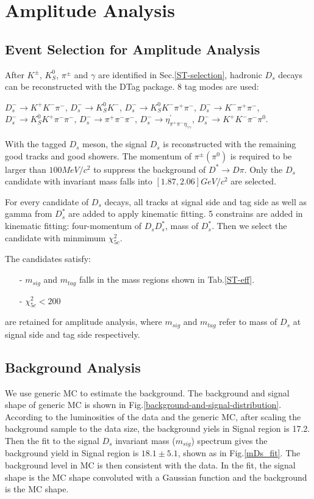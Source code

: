 \section{Amplitude Analysis}

\subsection{Event Selection for Amplitude Analysis}
\label{AASelection}
\par{
After $K^{\pm}$, $K_S^{0}$, $\pi^{\pm}$ and $\gamma$ are identified in Sec.\ref{ST-selection}, hadronic $D_{s}$ decays can be reconstructed with the DTag package. 8 tag modes are used:

$D_{s}^{-} \rightarrow K^{+}K^{-}\pi^{-}$, $D_{s}^{-} \rightarrow K_{S}^{0}K^{-}$, $D_{s}^{-} \rightarrow K_{S}^{0}K^{-}\pi^{+}\pi^{-}$, $D_{s}^{-} \rightarrow K^{-}\pi^{+}\pi^{-}$, $D_{s}^{-} \rightarrow K_{S}^{0}K^{+}\pi^{-}\pi^{-}$, $D_{s}^{-} \rightarrow \pi^{+}\pi^{-}\pi^{-}$, $D_{s}^{-} \rightarrow \eta^{'}_{\pi^{+}\pi^{-}\eta_{\gamma\gamma}}$, $D_{s}^{-} \rightarrow K^{+}K^{-}\pi^{-}\pi^{0}$.


With the tagged $D_{s}$ meson, the signal $D_{s}$ is reconstructed with the remaining good tracks and good showers. 
The momentum of $\pi^{\pm}(\pi^{0})$ is required to be larger than $100 MeV/c^{2}$ to suppress the background of $D^{*} \rightarrow D\pi$.
Only the $D_{s}$ candidate with invariant mass falls into $[1.87, 2.06]GeV/c^{2}$ are selected.

For every candidate of $D_{s}$ decays, all tracks at signal side and tag side as well as gamma from $D_{s}^{*}$ are added to apply kinematic fitting. 5 constrains are added in kinematic fitting: four-momentum of $D_{s}D_{s}^{*}$, mass of $D_{s}^{*}$. Then we select the candidate with minmimum $\chi_{5c}^{2}$.  

The candidates satisfy:
\begin{itemize}
    \item[-] $m_{sig}$ and $m_{tag}$ falls in the mass regions shown in Tab.\ref{ST-eff}. 
	\item[-] $\chi_{5c}^{2} < 200 $
\end{itemize}
are retained for amplitude analysis, where $m_{sig}$ and $m_{tag}$ refer to mass of $D_{s}$ at signal side and tag side respectively.
}

\subsection{Background Analysis}
We use generic MC to estimate the background. The background and signal shape of generic MC is shown in Fig.\ref{background-and-signal-distribution}. 
According to the luminosities of the data and the generic MC, after scaling the background sample to the data size, the background yiels in Signal region is 17.2. 
Then the fit to the signal $D_{s}$ invariant mass ($m_{sig}$) spectrum gives the background yield in Signal region is $18.1 \pm 5.1$, shown as in Fig.\ref{mDs_fit}.  
The background level in MC is then consistent with the data. In the fit, the signal shape is the MC shape convoluted with a Gaussian function and the background is the MC shape. 

